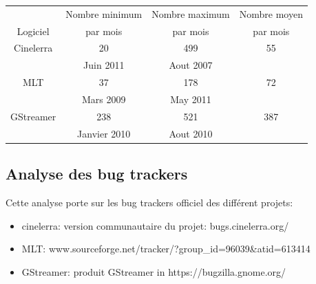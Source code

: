 \begin{center}

  \begin{tabular}{ | c | c | c | c|}

    \hline

         & Nombre minimum & Nombre maximum & Nombre moyen \\

Logiciel & par mois       & par mois   & par mois \\

\hline \hline

Cinelerra & 20 & 499 & 55 \\

          &  Juin 2011 & Aout 2007 & \\

\hline

MLT & 37 & 178 & 72 \\

     & Mars 2009 & May 2011 & \\

\hline

GStreamer & 238 & 521 &  387\\

          & Janvier 2010 & Aout 2010 & \\

\hline

  \end{tabular}

\end{center}

\subsection {Analyse des bug trackers}

Cette analyse porte sur les bug trackers officiel des différent
projets:

\begin{itemize}

  \item {cinelerra: version communautaire du projet:
    bugs.cinelerra.org/}

  \item {MLT: www.sourceforge.net/tracker/?group\_id=96039\&atid=613414}

  \item {GStreamer: produit GStreamer in https://bugzilla.gnome.org/}

\end{itemize}



